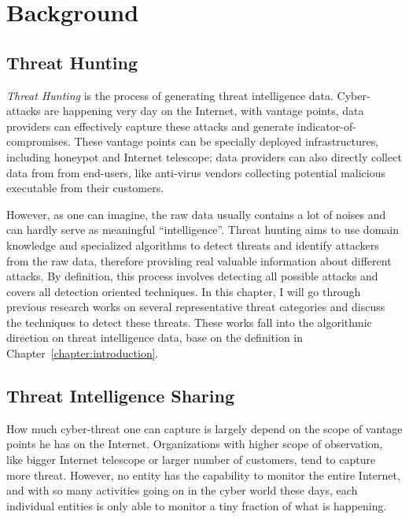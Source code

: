 \chapter{Background}
\label{chapter:background}

\section{Threat Hunting}
\textit{Threat Hunting} is the process of generating threat intelligence
data. Cyber-attacks are happening very day on the Internet, with vantage 
points, data providers can effectively capture these attacks and generate 
indicator-of-compromises. These vantage points can be specially
deployed infrastructures, including honeypot and Internet telescope; data
providers can also directly collect data from from end-users, like 
anti-virus vendors collecting potential malicious executable from their
customers. 

However, as one can
imagine, the raw data usually contains a lot of noises and can hardly
serve as meaningful ``intelligence''. Threat hunting aims to use domain 
knowledge and specialized algorithms to detect threats and identify
attackers from the raw data, therefore providing real valuable 
information about different attacks. By definition, this process involves
detecting all possible attacks and covers all detection oriented 
techniques. In this chapter, I will go through previous research works
on several representative threat categories and discuss the techniques to 
detect these threats. These works fall into the algorithmic direction on
threat intelligence data, base on the definition in 
Chapter~\ref{chapter:introduction}.







\section{Threat Intelligence Sharing}
How much cyber-threat one can capture is largely depend on the scope of
vantage points he has on the Internet. Organizations with higher scope of 
observation,
like bigger Internet telescope or larger number of customers, tend to
capture more threat. However, no entity has the capability to monitor
the entire Internet, and with so many activities going on in the cyber
world these days, each individual entities is only able to monitor a
tiny fraction of what is happening. 

